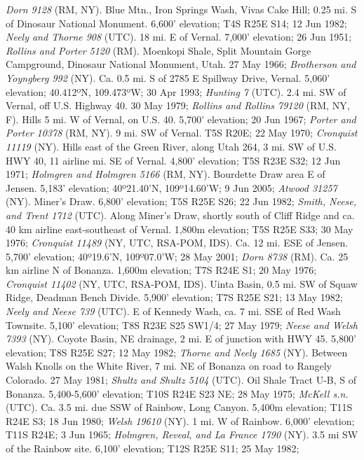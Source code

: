 \textit{Dorn 9128} (RM, NY).
Blue Mtn., Iron Springs Wash, Vivas Cake Hill; 0.25 mi. S of Dinosaur National
Monument. 6,600' elevation; T4S R25E S14; 12 Jun 1982;
\textit{Neely and Thorne 908} (UTC).
18 mi. E of Vernal. 7,000' elevation; 26 Jun 1951;
\textit{Rollins and Porter 5120} (RM).
Moenkopi Shale, Split Mountain Gorge Campground, Dinosaur National Monument,
Utah. 27 May 1966; \textit{Brotherson and Yoyngberg 992} (NY).
Ca. 0.5 mi. S of 2785 E Spillway Drive, Vernal. 5,060' elevation;
40.412ºN, 109.473ºW; 30 Apr 1993; \textit{Hunting 7} (UTC).
2.4 mi. SW of Vernal, off U.S. Highway 40. 30 May 1979;
\textit{Rollins and Rollins 79120} (RM, NY, F).
Hills 5 mi. W of Vernal, on U.S. 40. 5,700' elevation; 20 Jun 1967;
\textit{Porter and Porter 10378} (RM, NY).
9 mi. SW of Vernal. T5S R20E; 22 May 1970; \textit{Cronquist 11119} (NY).
Hills east of the Green River, along Utah 264, 3 mi. SW of U.S. HWY 40, 11
airline mi. SE of Vernal. 4,800' elevation; T5S R23E S32; 12 Jun 1971;
\textit{Holmgren and Holmgren 5166} (RM, NY).
Bourdette Draw area E of Jensen. 5,183' elevation;
40º21.40'N, 109º14.60'W; 9 Jun 2005; \textit{Atwood 31257} (NY).
Miner's Draw. 6,800' elevation; T5S R25E S26; 22 Jun 1982;
\textit{Smith, Neese, and Trent 1712} (UTC).
Along Miner's Draw, shortly south of Cliff Ridge and ca. 40 km airline
east-southeast of Vernal. 1,800m elevation; T5S R25E S33; 30 May 1976;
\textit{Cronquist 11489} (NY, UTC, RSA-POM, IDS).
Ca. 12 mi. ESE of Jensen. 5,700' elevation; 40º19.6'N, 109º07.0'W;
28 May 2001; \textit{Dorn 8738} (RM).
Ca. 25 km airline N of Bonanza. 1,600m elevation; T7S R24E S1; 20 May 1976;
\textit{Cronquist 11402} (NY, UTC, RSA-POM, IDS).
Uinta Basin, 0.5 mi. SW of Squaw Ridge, Deadman Bench Divide. 5,900' elevation;
T7S R25E S21; 13 May 1982; \textit{Neely and Neese 739} (UTC).
E of Kennedy Wash, ca. 7 mi. SSE of Red Wash Townsite. 5,100' elevation;
T8S R23E S25 SW1/4; 27 May 1979; \textit{Neese and Welsh 7393} (NY).
Coyote Basin, NE drainage, 2 mi. E of junction with HWY 45. 5,800' elevation;
T8S R25E S27; 12 May 1982; \textit{Thorne and Neely 1685} (NY).
Between Walsh Knolls on the White River, 7 mi. NE of Bonanza on road to Rangely
Colorado. 27 May 1981; \textit{Shultz and Shultz 5104} (UTC).
Oil Shale Tract U-B, S of Bonanza. 5,400-5,600' elevation; T10S R24E S23 NE;
28 May 1975; \textit{McKell s.n.} (UTC).
Ca. 3.5 mi. due SSW of Rainbow, Long Canyon. 5,400m elevation; T11S R24E S3;
18 Jun 1980; \textit{Welsh 19610} (NY).
1 mi. W of Rainbow. 6,000' elevation; T11S R24E; 3 Jun 1965;
\textit{Holmgren, Reveal, and La France 1790} (NY).
3.5 mi SW of the Rainbow site. 6,100' elevation; T12S R25E S11; 25 May 1982;
